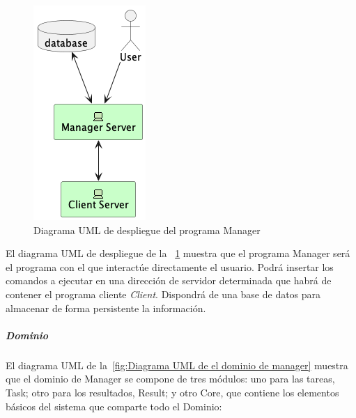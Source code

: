 \begin{figure}[H]
    \centering
    \includegraphics[height=0.3\textheight]{./part/Proyecto_ejecutivo/memoria_descriptiva/descripcionDelProyecto/manager/uml/managerServerConcept}
    \caption{Diagrama UML de despliegue del programa Manager}\label{fig:diagrama_uml_de_despliegue_del_manager}
\end{figure}

El diagrama UML de despliegue de la ~\cref{fig:diagrama_uml_de_despliegue_del_manager} muestra que el programa Manager será el programa con el que interactúe directamente el usuario.
Podrá insertar los comandos a ejecutar en una dirección de servidor determinada que habrá de contener el programa cliente \textit{Client}.
Dispondrá de una base de datos para almacenar de forma persistente la información.

\subparagraph{Dominio}

El diagrama UML de la~\cref{fig:Diagrama UML de el dominio de manager} muestra que el dominio de Manager se compone de tres módulos: uno para las tareas, Task;
otro para los resultados, Result;
y otro Core, que contiene los elementos básicos del sistema que comparte todo el Dominio:

